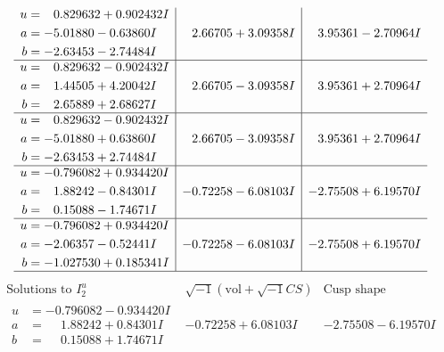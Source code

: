 \documentclass[1p]{elsarticle_modified}
\theoremstyle{definition}
\newcommand{\I}{\sqrt{-1}}
\begin{document}
$$\begin{array}{c|c|c}
\begin{aligned}
u &= \phantom{-}0.829632 + 0.902432 I \\
a &= -5.01880 - 0.63860 I \\
b &= -2.63453 - 2.74484 I\end{aligned}
 & \phantom{-}2.66705 + 3.09358 I & \phantom{-}3.95361 - 2.70964 I \\ \hline\begin{aligned}
u &= \phantom{-}0.829632 - 0.902432 I \\
a &= \phantom{-}1.44505 + 4.20042 I \\
b &= \phantom{-}2.65889 + 2.68627 I\end{aligned}
 & \phantom{-}2.66705 - 3.09358 I & \phantom{-}3.95361 + 2.70964 I \\ \hline\begin{aligned}
u &= \phantom{-}0.829632 - 0.902432 I \\
a &= -5.01880 + 0.63860 I \\
b &= -2.63453 + 2.74484 I\end{aligned}
 & \phantom{-}2.66705 - 3.09358 I & \phantom{-}3.95361 + 2.70964 I \\ \hline\begin{aligned}
u &= -0.796082 + 0.934420 I \\
a &= \phantom{-}1.88242 - 0.84301 I \\
b &= \phantom{-}0.15088 - 1.74671 I\end{aligned}
 & -0.72258 - 6.08103 I & -2.75508 + 6.19570 I \\ \hline\begin{aligned}
u &= -0.796082 + 0.934420 I \\
a &= -2.06357 - 0.52441 I \\
b &= -1.027530 + 0.185341 I\end{aligned}
 & -0.72258 - 6.08103 I & -2.75508 + 6.19570 I\\
 \hline 
 \end{array}$$\newpage$$\begin{array}{c|c|c}  
\text{Solutions to }I^u_{2}& \I (\text{vol} + \sqrt{-1}CS) & \text{Cusp shape}\\
 \hline 
\begin{aligned}
u &= -0.796082 - 0.934420 I \\
a &= \phantom{-}1.88242 + 0.84301 I \\
b &= \phantom{-}0.15088 + 1.74671 I\end{aligned}
 & -0.72258 + 6.08103 I & -2.75508 - 6.19570 I \\ \hline\begin{aligned}

\end{aligned}
\end{array}$$
\end{document}
